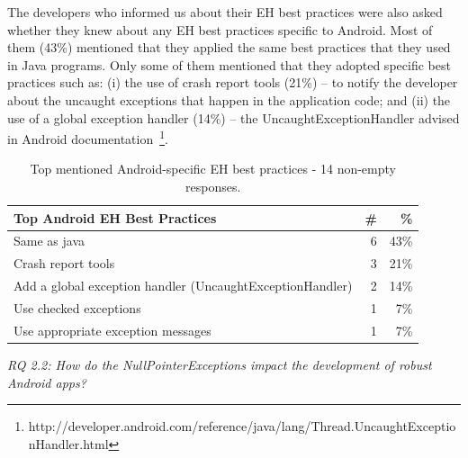 The developers who informed us about their EH best practices were also asked whether they knew about any EH best practices specific to Android. Most of them (43\%) mentioned that they applied the same best practices that they used in Java programs. Only some of them mentioned that they adopted specific best practices such as: (i) the use of crash report tools (21\%) -- to notify the developer about the uncaught exceptions that happen in the application code; and (ii) the use of a global exception handler (14\%) -- the UncaughtExceptionHandler advised in Android documentation~\footnote{http://developer.android.com/reference/java/lang/Thread.UncaughtExceptionHandler.html}.					
									
\begin{table}
\scriptsize
\centering
\begin{tabular}{lrr}
\hline
\bfseries{Top Android EH Best Practices } & \bfseries{\#} & \bfseries{\%} \\
\hline
Same as java	& 6 &	43\% \\
Crash report tools	 & 3 &	21\% \\
Add a global exception handler (UncaughtExceptionHandler)	 & 2 & 14\% \\
Use checked exceptions	& 1 &	7\% \\
Use appropriate exception messages	& 1 &	7\% \\
\hline
\end{tabular}
\caption{Top mentioned Android-specific EH best practices -  14 non-empty responses. }
\label{tab:androidpractices}
\end{table}			

\bigskip




\bigskip

\noindent\emph{RQ 2.2: How do the NullPointerExceptions impact the development of robust Android apps?}


